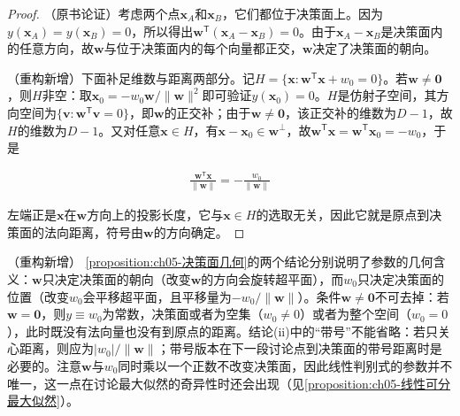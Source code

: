 \documentclass[../../main.tex]{subfiles}
\begin{document}
\begin{proof}
（原书论证）考虑两个点$\boldsymbol{x}_A$和$\boldsymbol{x}_B$，它们都位于决策面上。因为$y(\boldsymbol{x}_A)=y(\boldsymbol{x}_B)=0$，所以得出$\boldsymbol{w}^{\mathsf{T}}(\boldsymbol{x}_A-\boldsymbol{x}_B)=0$。由于$\boldsymbol{x}_A-\boldsymbol{x}_B$是决策面内的任意方向，故$\boldsymbol{w}$与位于决策面内的每个向量都正交，$\boldsymbol{w}$决定了决策面的朝向。

（重构新增）下面补足维数与距离两部分。记$H=\{\boldsymbol{x}:\boldsymbol{w}^{\mathsf{T}}\boldsymbol{x}+w_0=0\}$。若$\boldsymbol{w}\neq\boldsymbol{0}$，则$H$非空：取$\boldsymbol{x}_0=-w_0\boldsymbol{w}/\lVert\boldsymbol{w}\rVert^{2}$即可验证$y(\boldsymbol{x}_0)=0$。$H$是仿射子空间，其方向空间为$\{\boldsymbol{v}:\boldsymbol{w}^{\mathsf{T}}\boldsymbol{v}=0\}$，即$\boldsymbol{w}$的正交补；由于$\boldsymbol{w}\neq\boldsymbol{0}$，该正交补的维数为$D-1$，故$H$的维数为$D-1$。又对任意$\boldsymbol{x}\in H$，有$\boldsymbol{x}-\boldsymbol{x}_0\in\boldsymbol{w}^{\perp}$，故$\boldsymbol{w}^{\mathsf{T}}\boldsymbol{x}=\boldsymbol{w}^{\mathsf{T}}\boldsymbol{x}_0=-w_0$，于是

\begin{align}
  \frac{\boldsymbol{w}^{\mathsf{T}}\boldsymbol{x}}{\lVert\boldsymbol{w}\rVert}=-\frac{w_0}{\lVert\boldsymbol{w}\rVert}
\end{align}

左端正是$\boldsymbol{x}$在$\boldsymbol{w}$方向上的投影长度，它与$\boldsymbol{x}\in H$的选取无关，因此它就是原点到决策面的法向距离，符号由$\boldsymbol{w}$的方向确定。
\end{proof}

\begin{remark}（重构新增）
\cref{proposition:ch05-决策面几何}的两个结论分别说明了参数的几何含义：$\boldsymbol{w}$只决定决策面的朝向（改变$\boldsymbol{w}$的方向会旋转超平面），而$w_0$只决定决策面的位置（改变$w_0$会平移超平面，且平移量为$-w_0/\lVert\boldsymbol{w}\rVert$）。条件$\boldsymbol{w}\neq\boldsymbol{0}$不可去掉：若$\boldsymbol{w}=\boldsymbol{0}$，则$y\equiv w_0$为常数，决策面或者为空集（$w_0\neq0$）或者为整个空间（$w_0=0$），此时既没有法向量也没有到原点的距离。结论(ii)中的“带号”不能省略：若只关心距离，则应为$|w_0|/\lVert\boldsymbol{w}\rVert$；带号版本在下一段讨论点到决策面的带号距离时是必要的。注意$\boldsymbol{w}$与$w_0$同时乘以一个正数不改变决策面，因此线性判别式的参数并不唯一，这一点在讨论最大似然的奇异性时还会出现（见\cref{proposition:ch05-线性可分最大似然}）。
\end{remark}
\end{document}
